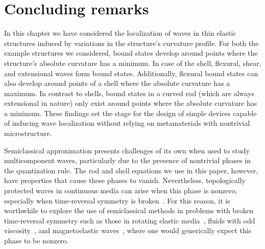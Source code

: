 \section{Concluding remarks}
\label{sec:conclusion}

In this chapter we have considered the localization of waves in thin elastic structures induced by variations in the structure's curvature profile.
For both the example structures we considered, bound states develop around points where the structure's absolute curvature has a minimum.
In case of the shell, flexural, shear, and extensional waves form bound states.
Additionally, flexural bound states can also develop around points of a shell where the absolute curvature has a maximum.
In contrast to shells, bound states in a curved rod (which are always extensional in nature) only exist around points where the absolute curvature has a minimum.
These findings set the stage for the design of simple devices capable of inducing wave localization without relying on metamaterials with nontrivial microstructure.

Semiclassical approximation presents challenges of its own when used to study multicomponent waves, particularly due to the presence of nontrivial phases in the quantization rule.
The rod and shell equations we use in this paper, however, have properties that cause these phases to vanish.
Nevertheless, topologically protected waves in continuous media can arise when this phase is nonzero, especially when time-reversal symmetry is broken~\cite{venaille2023}.
For this reason, it is worthwhile to explore the use of semiclassical methods in problems with broken time-reversal symmetry such as those in rotating elastic media~\cite{marijanovic2022}, fluids with odd viscosity~\cite{souslov2019}, and magnetoelastic waves~\cite{banos1956}, where one would generically expect this phase to be nonzero.

